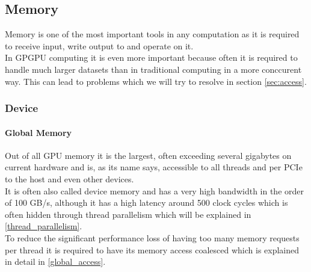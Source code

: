 \subsection{Memory}
Memory is one of the most important tools in any computation as it is required to receive input,
write output to and operate on it.\\
In GPGPU computing it is even more important because often it
is required to handle much larger datasets than in traditional computing in a more conccurent way.
This can lead to problems which we will try to resolve in section \ref{sec:access}.\\
\subsubsection{Device}
\paragraph{Global Memory}
\label{hardware_global}
Out of all GPU memory it is the largest, often exceeding several gigabytes on current hardware and is, as its name says, accessible to all threads and per PCIe to the host and even other devices.\\
It is often also called device memory and has a very high bandwidth in the order of 100 GB/s,
although it has a high latency around 500 clock cycles which is often hidden through thread parallelism which will be explained in \ref{thread_parallelism}.\\
To reduce the significant performance loss of having too many memory requests per thread it is required to have its memory access coalesced
which is explained in detail in \ref{global_access}.
